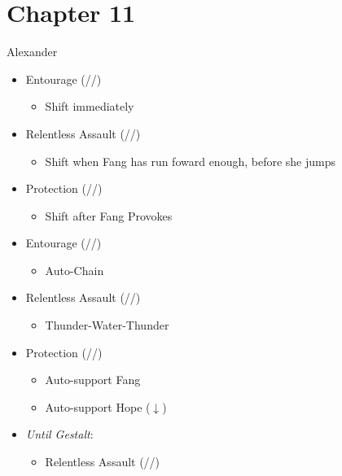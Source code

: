 \chapter{Chapter 11}

\renewcommand{\first}{[1] Entourage (\rav/\med/\sen)}
\renewcommand{\second}{[2] Protection (\syn/\med/\sen)}
\renewcommand{\third}{[3] }
\renewcommand{\fourth}{[4] }
\renewcommand{\fifth}{[5] }
\renewcommand{\sixth}{[6] Relentless Assault (\rav/\rav/\com)}
\begin{battle}[1:29]{Alexander}
	\begin{itemize}
		\item \first
		      \begin{itemize}
			      \item Shift immediately
		      \end{itemize}
		\item \sixth
		      \begin{itemize}
			      \item Shift when Fang  has run foward enough, before she jumps
		      \end{itemize}
		\item \second
		      \begin{itemize}
			      \item Shift after Fang Provokes
		      \end{itemize}
		\item \first
		      \begin{itemize}
			      \item Auto-Chain
		      \end{itemize}
		\item \sixth
		      \begin{itemize}
			      \item Thunder-Water-Thunder
		      \end{itemize}
		\item \second
		      \begin{itemize}
			      \item Auto-support Fang
			      \item Auto-support Hope ($\downarrow$)
		      \end{itemize}
		\item \textit{Until Gestalt}:
		      \begin{itemize}
			      \item \begin{flushleft}\sixth\end{flushleft}
			            \begin{itemize}

\end{itemize}
\end{itemize}
\end{itemize}
\end{battle}
